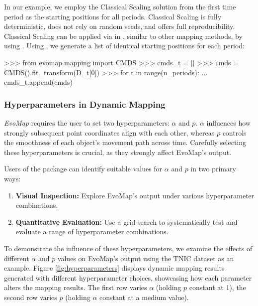 \documentclass[article]{jss}
\begin{document}
In our example, we employ the Classical Scaling solution from the first time period as the starting positions for all 
periods. Classical Scaling is fully deterministic, does not rely on random seeds, and offers full reproducibility. 
Classical Scaling can be applied via  in , similar to other 
mapping methods, by using . Using , we generate a list of identical starting positions 
for each period:

\begin{CodeChunk}
\begin{CodeInput}
>>> from evomap.mapping import CMDS
>>> cmds_t = []
>>> cmds = CMDS().fit_transform(D_t[0])
>>> for t in range(n_periods):
...     cmds_t.append(cmds)
\end{CodeInput}
\end{CodeChunk}

\subsubsection{Hyperparameters in Dynamic Mapping}

\emph{EvoMap} requires the user to set two hyperparameters: $\alpha$ and $p$. 
$\alpha$ influences how strongly subsequent point coordinates align with each other, 
whereas $p$ controls the smoothness of each object's movement path across time. Carefully selecting
these hyperparameters is crucial, as they strongly affect EvoMap's output. 

Users of the  package can identify suitable values for $\alpha$ and $p$ in two primary ways: 

\begin{enumerate}
  \item \textbf{Visual Inspection:} Explore EvoMap's output under various hyperparameter combinations. 
  \item \textbf{Quantitative Evaluation:} Use a grid search to systematically test and evaluate a range of %
  hyperparameter combinations.
\end{enumerate}

To demonstrate the influence of these hyperparameters, we examine the effects of different $\alpha$ and $p$ 
values on EvoMap's output using the TNIC dataset as an example. Figure \ref{fig:hyperparameters} displays 
dynamic mapping results generated with different hyperparameter choices, showcasing how each parameter alters the mapping 
results. The first row varies $\alpha$ (holding $p$ constant at 1), the second row varies $p$ (holding $\alpha$ constant
at a medium value).
\end{document}
